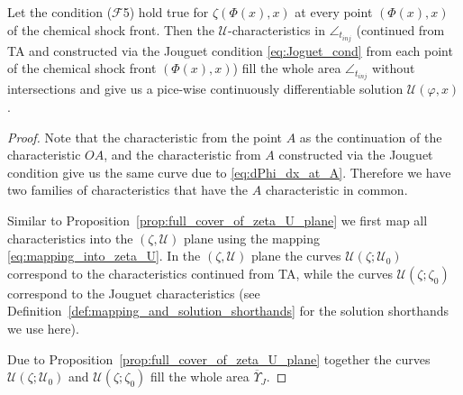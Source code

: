\documentclass[10pt,a4paper]{amsart}
\begin{document}
\begin{theorem}
\label{thm1}
Let the condition ($\mathcal F$5) hold true for $\zeta(\Phi(x), x)$ at every point $(\Phi(x), x)$  of the chemical shock front. Then the $\mathcal U$-characteristics in $\angle_{t_{inj}}$ (continued from TA and constructed via the Jouguet condition \eqref{eq:Joguet_cond} from each point of the chemical shock front $(\Phi(x),x)$) fill the whole area $\angle_{t_{inj}}$ without intersections and give us a pice-wise continuously differentiable solution $\mathcal U(\varphi, x)$.
\end{theorem}

\begin{proof}
Note that the characteristic from the point $A$ as the continuation of the characteristic $OA$, and the characteristic from $A$ constructed via the Jouguet condition give us the same curve due to \eqref{eq:dPhi_dx_at_A}. Therefore we have two families of characteristics that have the $A$ characteristic in common.

Similar to Proposition~\ref{prop:full_cover_of_zeta_U_plane} we first map all characteristics into the $(\zeta, \mathcal U)$ plane using the mapping \eqref{eq:mapping_into_zeta_U}. In the $(\zeta, \mathcal U)$ plane the curves $\mathcal U(\zeta; \mathcal U_0)$ correspond to the characteristics continued from TA, while the curves $\mathcal U(\zeta; \zeta_0)$ correspond to the Jouguet characteristics (see Definition~\ref{def:mapping_and_solution_shorthands} for the solution shorthands we use here).

Due to Proposition~\ref{prop:full_cover_of_zeta_U_plane} together the curves $\mathcal U(\zeta; \mathcal U_0)$ and $\mathcal U(\zeta; \zeta_0)$ fill the whole area $\overline{\Upsilon}_J$.


\end{proof}
\end{document}
